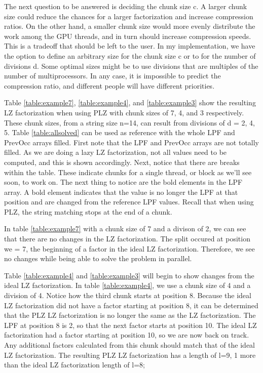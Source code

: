 The next question to be answered is deciding the chunk size c. 
A larger chunk size could reduce the chances for a larger factorization and increase compression ratios.
On the other hand, a smaller chunk size would more evenly distribute the work among the GPU threads, and in turn should increase compression speeds.
This is a tradeoff that should be left to the user.
In my implementation, we have the option to define an arbitrary size for the chunk size c or to for the number of divisions d.
Some optimal sizes might be to use divisions that are multiples of the number of multiprocessors.
In any case, it is impossible to predict the compression ratio, and different people will have different priorities.

Table \ref{table:example7}, \ref{table:example4}, and \ref{table:example3} show the resulting LZ factorization when using PLZ with chunk sizes of 7, 4, and 3 respectively. 
These chunk sizes, from a string size n=14, can result from divisions of d = 2, 4, 5.
Table \ref{table:allsolved} can be used as reference with the whole LPF and PrevOcc arrays filled.
First note that the LPF and PrevOcc arrays are not totally filled.
As we are doing a lazy LZ factorization, not all values need to be computed, and this is shown accordingly.
Next, notice that there are breaks within the table.
These indicate chunks for a single thread, or block as we'll see soon, to work on.
The next thing to notice are the bold elements in the LPF array.
A bold element indicates that the value is no longer the LPF at that position and are changed from the reference LPF values.
Recall that when using PLZ, the string matching stops at the end of a chunk.

In table \ref{table:example7} with a chunk size of 7 and a divison of 2, we can see that there are no changes in the LZ factorization.
The split occured at position we = 7, the beginning of a factor in the ideal LZ factorization.
Therefore, we see no changes while being able to solve the problem in parallel.

Table \ref{table:example4} and \ref{table:example3} will begin to show changes from the ideal LZ factorization.
In table \ref{table:example4}, we use a chunk size of 4 and a division of 4.
Notice how the third chunk starts at position 8.
Because the ideal LZ factorization did not have a factor starting at position 8, it can be determined that the PLZ LZ factorization is no longer the same as the LZ factorization.
The LPF at position 8 is 2, so that the next factor starts at position 10.
The ideal LZ factorization had a factor starting at position 10, so we are now back on track.
Any additional factors calculated from this chunk should match that of the ideal LZ factorization.
The resulting PLZ LZ factorization has a length of l=9, 1 more than the ideal LZ factorization length of l=8;

